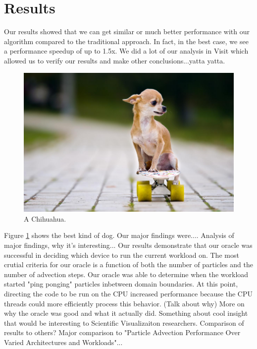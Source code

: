 \documentclass{IEEEtran}
\begin{document}
\section{Results}
Our results showed that we can get similar or much better performance with our algorithm compared to the traditional approach. 
%
In fact, in the best case, we see a performance speedup of up to 1.5x.
%
We did a lot of our analysis in Visit \cite{visit} which allowed us to verify our results and make other conclusions...yatta yatta.
%
\begin{figure}
  \includegraphics[width=\linewidth]{chichi.jpg}
  \caption{A Chihuahua.}
  \label{fig:chichi}
\end{figure}
%
Figure \ref{fig:chichi} shows the best kind of dog.
%
Our major findings were....
%
Analysis of major findings, why it's interesting...
%
Our results demonstrate that our oracle was successful in deciding which device to run the current workload on.
%
The most crutial criteria for our oracle is a function of both the number of particles and the number of advection steps.
%
Our oracle was able to determine when the workload started "ping ponging" particles inbetween domain boundaries.
%
At this point, directing the code to be run on the CPU increased performance because the CPU threads could more efficiently process this behavior. (Talk about why)
%
More on why the oracle was good and what it actually did.
%
Something about cool insight that would be interesting to Scientific Visualizaiton researchers.
%
Comparison of results to others? 
%
Major comparison to "Particle Advection Performance Over Varied Architectures and Workloads"...
%
\end{document}
